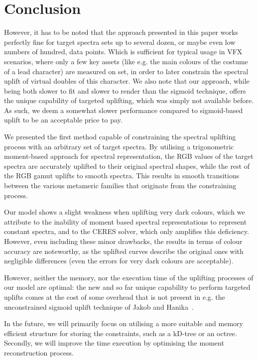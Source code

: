 \chapter*{Conclusion}


However, it has to be noted that the approach presented in this paper works perfectly fine for target spectra sets up to several dozen, or maybe even low numbers of hundred, data points. Which is sufficient for typical usage in VFX scenarios, where only a few key assets (like e.g. the main colours of the costume of a lead character) are measured on set, in order to later constrain the spectral uplift of virtual doubles of this character.
We also note that our approach, while being both slower to fit and slower to render than the sigmoid technique, offers the unique capability of targeted uplifting, which was simply not available before. As such, we deem a somewhat slower performance compared to sigmoid-based uplift to be an acceptable price to pay.



We presented the first method capable of constraining the spectral uplifting process with an arbitrary set of target spectra. By utilising a trigonometric moment-based approach for spectral representation, the RGB values of the target spectra are accurately uplifted to their original spectral shapes, while the rest of the RGB gamut uplifts to smooth spectra. This results in smooth transitions between the various metameric families that originate from the constraining process.

Our model shows a slight weakness when uplifting very dark colours, which we attribute to the inability of moment based spectral representations to represent constant spectra, and to the CERES solver, which only amplifies this deficiency. However, even including these minor drawbacks, the results in terms of colour accuracy are noteworthy, as the uplifted curves describe the original ones with negligible differences (even the errors for very dark colours are acceptable).

However, neither the memory, nor the execution time of the uplifting processes of our model are optimal: the new and so far unique capability to perform targeted uplifts comes at the cost of some overhead that is not present in e.g. the unconstrained sigmoid uplift technique of Jakob and Hanika~\cite{jakob2019low}.

In the future, we will primarily focus on utilising a more suitable and memory efficient structure for storing the constraints, such as a kD-tree or an octree. Secondly, we will improve the time execution by optimising the moment reconstruction process.

